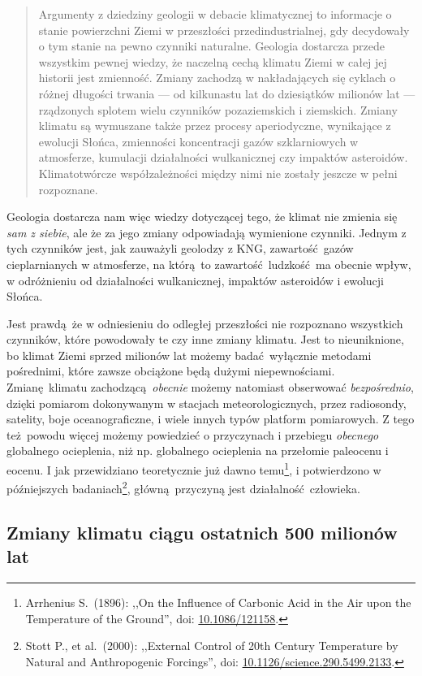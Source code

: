 \documentclass[12pt]{article}
\newcommand{\doi}[1]{doi: \href{htts://doi.org/#1}{#1}}
\begin{document}
\begin{quotation}
	Argumenty z dziedziny geologii w debacie klimatycznej to informacje o stanie powierzchni Ziemi w przeszłości przedindustrialnej, gdy decydowały o tym stanie na pewno czynniki naturalne. Geologia dostarcza przede wszystkim pewnej wiedzy, że naczelną cechą klimatu Ziemi w całej jej historii jest zmienność. Zmiany zachodzą w nakładających się cyklach o różnej długości trwania --- od kilkunastu lat do dziesiątków milionów lat --- rządzonych splotem wielu czynników pozaziemskich i ziemskich. Zmiany klimatu są wymuszane także przez procesy aperiodyczne, wynikające z ewolucji Słońca, zmienności  koncentracji gazów szklarniowych w atmosferze, kumulacji działalności wulkanicznej czy impaktów asteroidów. Klimatotwórcze współzależności między nimi nie zostały jeszcze w pełni rozpoznane.
\end{quotation}

Geologia dostarcza nam więc wiedzy dotyczącej tego, że klimat nie zmienia się \emph{sam z siebie}, ale że za jego zmiany odpowiadają wymienione czynniki. Jednym z tych czynników jest, jak zauważyli geolodzy z KNG, zawartość gazów cieplarnianych w atmosferze, na którą to zawartość ludzkość ma obecnie wpływ, w odróżnieniu od działalności wulkanicznej, impaktów asteroidów i ewolucji Słońca.

Jest prawdą że w odniesieniu do odległej przeszłości nie rozpoznano wszystkich czynników, które powodowały te czy inne zmiany klimatu. Jest to nieuniknione, bo klimat Ziemi sprzed milionów lat możemy badać wyłącznie metodami pośrednimi, które zawsze obciążone będą dużymi niepewnościami. Zmianę klimatu zachodzącą \emph{obecnie} możemy natomiast obserwować \emph{bezpośrednio}, dzięki pomiarom dokonywanym w stacjach meteorologicznych, przez radiosondy, satelity, boje oceanograficzne, i wiele innych typów platform pomiarowych. Z tego też powodu więcej możemy powiedzieć o przyczynach i przebiegu \emph{obecnego} globalnego ocieplenia, niż np. globalnego ocieplenia na przełomie paleocenu i eocenu. I jak przewidziano teoretycznie już dawno temu\footnote{Arrhenius S.~(1896): ,,On the Influence of Carbonic Acid in the Air upon the Temperature of the Ground'', \doi{10.1086/121158}.}, i potwierdzono w późniejszych badaniach\footnote{Stott P., et al.~(2000): ,,External Control of 20th Century Temperature by Natural and Anthropogenic Forcings'', \doi{10.1126/science.290.5499.2133}.}, główną przyczyną jest działalność człowieka.

\newpage

\subsection*{Zmiany klimatu ciągu ostatnich 500 milionów lat}
\end{document}
